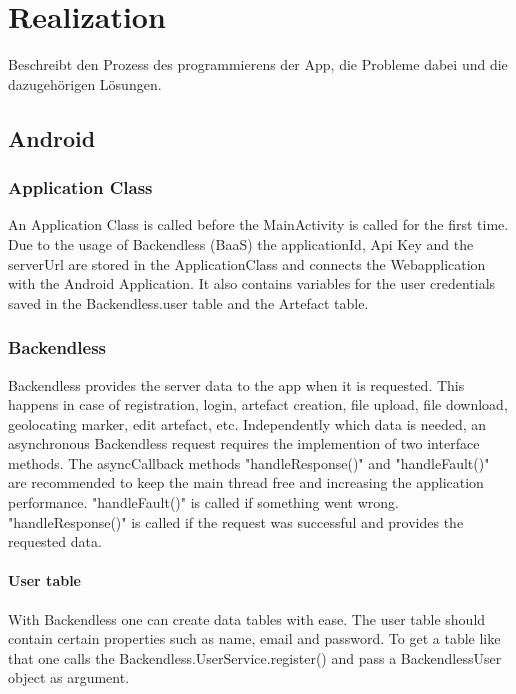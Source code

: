 \newpage
\chapter{Realization}
\label{cap:Realization}
Beschreibt den Prozess des programmierens der App, die Probleme dabei und die dazugehörigen Lösungen.

\section{Android}
\subsection{Application Class}
An Application Class is called before the MainActivity is called for the first time. Due to the usage of Backendless (BaaS) the applicationId, Api Key and the serverUrl are stored in the ApplicationClass and connects the Webapplication with the Android Application. It also contains variables for the user credentials saved in the Backendless.user table and the Artefact table. 

\subsection{Backendless}
Backendless provides the server data to the app when it is requested. This happens in case of registration, login, artefact creation, file upload, file download, geolocating marker, edit artefact, etc.
Independently which data is needed, an asynchronous Backendless request requires the implemention of two interface methods. The asyncCallback methods "handleResponse()" and "handleFault()" are recommended to keep the main thread free and increasing the application performance. "handleFault()" is called if something went wrong. "handleResponse()" is called if the request was successful and provides the requested data.

\subsubsection{User table}
With Backendless one can create data tables with ease. The user table should contain certain properties such as name, email and password. To get a table like that one calls the Backendless.UserService.register() and pass a BackendlessUser object as argument.

